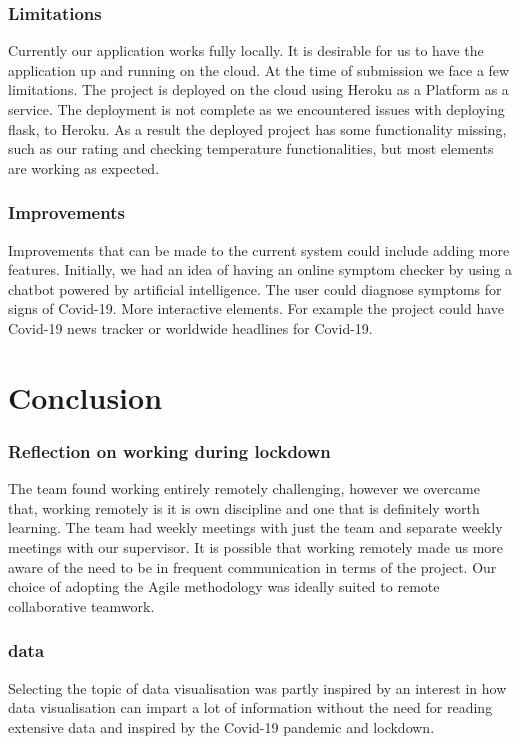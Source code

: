 \subsection{Limitations}
Currently our application works fully locally. It is desirable for us to have the application up and running on the cloud. At the time of submission we face a few limitations. The project is deployed on the cloud using Heroku as a Platform as a service. The deployment is not complete as we encountered issues with deploying flask, to Heroku. As a result the deployed project has some functionality missing, such as our rating and checking temperature functionalities, but most elements are working as expected.  



\subsection{Improvements}
Improvements that can be made to the current system could include adding more features. Initially, we had an idea of having an online symptom checker by using a chatbot powered by artificial intelligence. The user could diagnose symptoms for signs of Covid-19.
More interactive elements. For example the project could have Covid-19 news tracker or worldwide headlines for Covid-19.



\chapter{Conclusion}
\subsection{Reflection on working during lockdown}
The team found working entirely remotely challenging, however we overcame that, working remotely is it is own discipline and one that is definitely worth learning. The team had weekly meetings with just the team and separate weekly meetings with our supervisor. It is possible that working remotely made us more aware of the need to be in frequent communication in terms of the project. Our choice of adopting the Agile methodology was ideally suited to remote collaborative teamwork.

\subsection{data}
Selecting the topic of data visualisation was partly inspired by an interest in how data visualisation can impart a lot of information without the need for reading extensive data and inspired by the Covid-19 pandemic and lockdown. 

